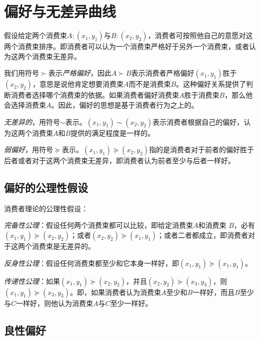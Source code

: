 \chapter{偏好与无差异曲线}
\label{chp:preferences-and-indifferent-curves}

假设给定两个消费束$A: (x_1,y_1)$与$B: (x_2,y_2)$，消费者可按照他自己的意愿对这两个消费束排序。即消费者可以认为一个消费束严格好于另外一个消费束，或者认为这两个消费束无差异。

我们用符号$\succ$表示\emph{严格偏好}，因此$A \succ B$表示消费者严格偏好$(x_1,y_1)$胜于$(x_2,y_2)$，意思是说他肯定想要消费束$A$而不是消费束$B$。这种偏好关系提供了判断消费者选择哪个消费束的依据。如果消费者偏好消费束$A$胜于消费束$B$，那么他会选择消费束$A$。因此，偏好的思想是基于消费者行为之上的。

\emph{无差异的}，用符号$\sim$表示。$(x_1,y_1) \sim (x_2,y_2)$表示消费者根据自己的偏好，认为这两个消费束$A$和$B$提供的满足程度是一样的。

\emph{弱偏好}，用符号$\succeq$表示。$(x_1,y_1) \succeq (x_2,y_2)$指的是消费者对于前者的偏好胜于后者或者对于这两个消费束无差异，即消费者认为前者至少与后者一样好。

\section{偏好的公理性假设}
消费者理论的公理性假设：
\begin{compactitem}
\item \emph{完备性公理}：假设任何两个消费束都可以比较，即给定消费束$A$和消费束 $B$，必有$(x_1,y_1) \succeq (x_2,y_2)$；或者$(x_2,y_2) \succeq (x_1,y_1)$；或者二者都成立，即消费者对于这两个消费束是无差异的。
\item \emph{反身性公理}：假设任何消费束都至少和它本身一样好，即$(x_1,y_1) \succeq (x_1,y_1)$。
\item \emph{传递性公理}：如果$(x_1,y_1) \succeq (x_2,y_2)$，并且$(x_2,y_2) \succeq (x_3,y_3)$，则$(x_1,y_1) \succeq (x_3,y_3)$。即，如果消费者认为消费束$A$至少和$B$一样好，而且$B$至少与$C$一样好，则他认为消费束$A$与$C$至少一样好。
\end{compactitem}

\section{良性偏好}
\label{sec:well-behaved-preference}

